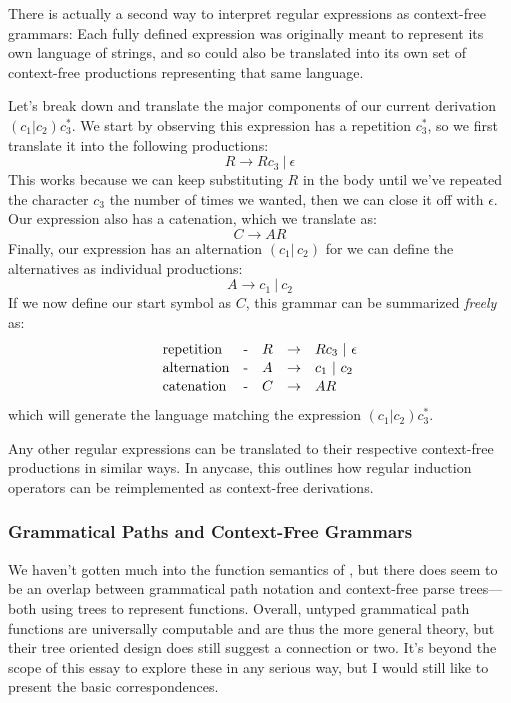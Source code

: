 \documentclass[twoside]{article}
\begin{document}
There is actually a second way to interpret regular expressions as context-free grammars: Each fully defined 
expression was originally meant to represent its own language of strings, and so could also be translated into
its own set of context-free productions representing that same language.

Let's break down and translate the major components of our current derivation $ (c_1|c_2)c_3^* $.
We start by observing this expression has a repetition $ c_3^* $, so we first translate it into the following productions:
$$ R \to Rc_3\ |\ \epsilon $$
This works because we can keep substituting $ R $ in the body until we've repeated the character $ c_3 $ the number of
times we wanted, then we can close it off with $ \epsilon $. Our expression also has a catenation, which we translate as:
$$ C \to AR $$
Finally, our expression has an alternation $ (c_1|\,c_2) $ for we can define the alternatives as individual productions:
$$ A \to c_1\ |\ c_2 $$
If we now define our start symbol as $ C $, this grammar can be summarized \emph{freely} as:
$$ \def\arraystretch{1.1}
\begin{array}{lclcl}
\mbox{repetition}		& \mbox{-} & R & \to & Rc_3\ |\ \epsilon			\\
\mbox{alternation}		& \mbox{-} & A & \to & c_1\ |\ c_2				\\
\mbox{catenation}		& \mbox{-} & C & \to & AR
\end{array} $$
which will generate the language matching the expression $ (c_1|c_2)c_3^* $.

Any other regular expressions can be translated to their respective context-free productions in similar ways.
In anycase, this outlines how regular induction operators can be reimplemented as context-free derivations.

\subsubsection*{Grammatical Paths and Context-Free Grammars}

We haven't gotten much into the function semantics of \cite{nikfs}, but there does seem to be an overlap between
grammatical path notation and context-free parse trees---both using trees to represent functions. Overall, untyped
grammatical path functions are universally computable and are thus the more general theory, but their tree oriented
design does still suggest a connection or two. It's beyond the scope of this essay to explore these in any serious way,
but I would still like to present the basic correspondences.
\end{document}
